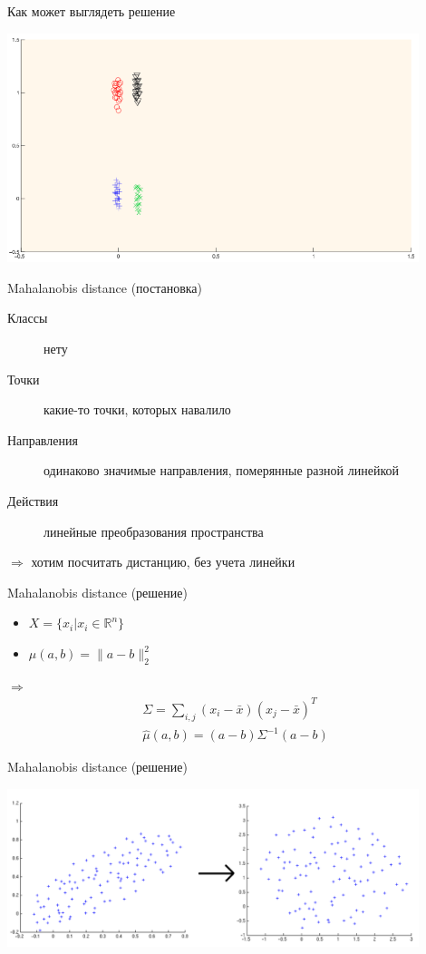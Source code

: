 \documentclass[14pt, fleqn, xcolor={dvipsnames, table}]{beamer}
\begin{document}
\begin{frame}{Как может выглядеть решение}
\begin{center}
\includegraphics[width=0.9\textwidth]{linsep-solution2.png}
\end{center}
\end{frame}

\begin{frame}{Mahalanobis distance (постановка)}
\begin{description}
\item[Классы] нету
\item[Точки] какие-то точки, которых навалило
\item[Направления] одинаково значимые направления, померянные разной линейкой
\item[Действия] линейные преобразования пространства
\end{description}
$\Rightarrow$ хотим посчитать дистанцию, без учета линейки
\end{frame}

\begin{frame}{Mahalanobis distance (решение)}
\begin{itemize}
  \item $X = \{x_i | x_i \in \mathbb{R}^n\}$
  \item $\mu(a,b) = \|a - b\|_2^2$
\end{itemize}
$\Rightarrow$
$$\begin{array}{c}
\Sigma = \sum_{i,j} \left(x_i - \bar{x}\right)\left(x_j - \bar{x}\right)^T \\
\hat{\mu}(a,b) = \left(a - b\right) \Sigma^{-1} \left(a - b\right)
\end{array}$$
\end{frame}

\begin{frame}{Mahalanobis distance (решение)}
\begin{center}
\includegraphics[width=0.9\textwidth]{mahalanobis.png}
\end{center}
\end{frame}
\end{document}

